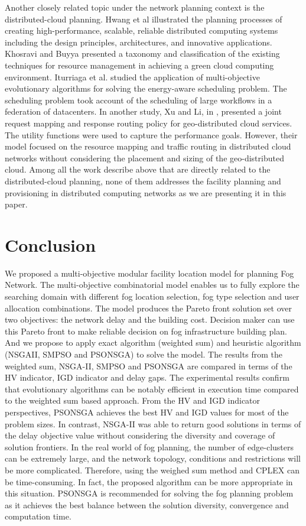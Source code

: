 \documentclass[10pt,journal,compsoc]{IEEEtran}
\begin{document}
Another closely related topic under the network planning context is the distributed-cloud planning. 
Hwang et al \cite{hwang2013distributed} illustrated the planning processes of creating high-performance, scalable, reliable distributed computing systems including the design principles, architectures, and innovative applications. 
Khosravi and Buyya \cite{enerfoot} presented a taxonomy and classification of the existing techniques for resource management in achieving a green cloud computing environment. 
Iturriaga et al. \cite{ITOR:ITOR12294} studied the application of multi-objective evolutionary algorithms for solving the energy-aware scheduling problem. The scheduling problem took account of the scheduling of large workflows in a federation of datacenters. In another study, Xu and Li, in \cite{6566873}, presented a joint request mapping and response routing policy for geo-distributed cloud services. The utility functions were used to capture the performance goals. However, their model focused on the resource mapping and traffic routing in distributed cloud networks without considering the placement and sizing of the geo-distributed cloud. 
Among all the work describe above that are directly related to the distributed-cloud planning, none of them addresses the facility planning and provisioning in distributed computing networks as we are presenting it in this paper.



\section{Conclusion}\label{conclu}
We proposed a multi-objective modular facility location model for planning Fog Network. The multi-objective combinatorial model enables us to fully explore the searching domain with different fog location selection, fog type selection and user allocation combinations. The model produces the Pareto front solution set over two objectives: the network delay and the building cost. Decision maker can use this Pareto front to make reliable decision on fog infrastructure building plan. 
And we propose to apply exact algorithm (weighted sum) and heuristic algorithm (NSGAII, SMPSO and PSONSGA) to solve the model. The results from the weighted sum, NSGA-II, SMPSO and PSONSGA are compared in terms of the HV indicator, IGD indicator and delay gaps. The experimental results confirm that evolutionary algorithms can be notably efficient in execution time compared to the weighted sum based approach. From the HV and IGD indicator perspectives, PSONSGA achieves the best HV and IGD values for most of the problem sizes. In contrast, NSGA-II was able to return good solutions in terms of the delay objective value without considering the diversity and coverage of solution frontiers.
In the real world of fog planning, the number of edge-clusters can be extremely large, and the network topology, conditions and restrictions will be more complicated. Therefore, using the weighed sum method and CPLEX can be time-consuming. In fact, the proposed algorithm can be more appropriate in this situation. PSONSGA is recommended for solving the fog planning problem as it achieves the best balance between the solution diversity, convergence and computation time.
\end{document}
